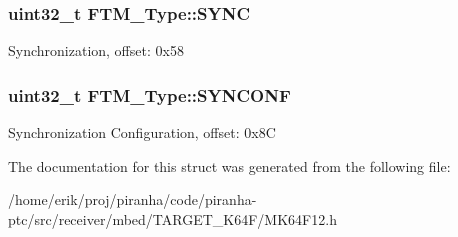 \subsubsection[{\texorpdfstring{S\+Y\+NC}{SYNC}}]{ uint32\+\_\+t F\+T\+M\+\_\+\+Type\+::\+S\+Y\+NC}\hypertarget{structFTM__Type_ad7f41548c14fec6c57dc5490b01c1b58}{}\label{structFTM__Type_ad7f41548c14fec6c57dc5490b01c1b58}
Synchronization, offset\+: 0x58 
\subsubsection[{\texorpdfstring{S\+Y\+N\+C\+O\+NF}{SYNCONF}}]{ uint32\+\_\+t F\+T\+M\+\_\+\+Type\+::\+S\+Y\+N\+C\+O\+NF}\hypertarget{structFTM__Type_a845f63d5c3bdf59235b7d629dc60207a}{}\label{structFTM__Type_a845f63d5c3bdf59235b7d629dc60207a}
Synchronization Configuration, offset\+: 0x8C 

The documentation for this struct was generated from the following file\+:\begin{DoxyCompactItemize}
\item 
/home/erik/proj/piranha/code/piranha-\/ptc/src/receiver/mbed/\+T\+A\+R\+G\+E\+T\+\_\+\+K64\+F/M\+K64\+F12.\+h\end{DoxyCompactItemize}
